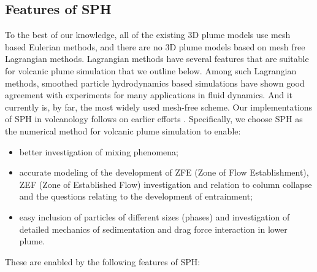 \documentclass[journal abbreviation, manuscript]{copernicus}
\begin{document}
\subsection{Features of SPH}
To the best of our knowledge, all of the existing 3D plume models use mesh based Eulerian methods, and there are no 3D plume models based on mesh free Lagrangian methods. Lagrangian methods have several features that are suitable for volcanic plume simulation that we outline below. Among such Lagrangian methods, smoothed particle hydrodynamics \citep{gingold1977smoothed,lucy1977numerical} based simulations have shown good agreement with experiments for many applications in fluid dynamics. And it currently is, by far, the most widely used mesh-free scheme. Our implementations of SPH in volcanology follows on earlier efforts   \citep{bursik2003smoothed,herault2010sph,haddad2016smoothed}.
Specifically, we choose SPH as the numerical method for volcanic plume simulation to enable:
\begin{itemize}
\item better investigation of mixing phenomena;
\item accurate modeling of the development of ZFE (Zone of Flow Establishment), ZEF (Zone of Established Flow) investigation and relation to column collapse and the questions relating to the development of entrainment; %
\item  easy inclusion of particles of different sizes (phases) and investigation of detailed mechanics of sedimentation and drag force interaction in lower plume.
\end{itemize}
These are enabled by the following features of SPH:
\end{document}
